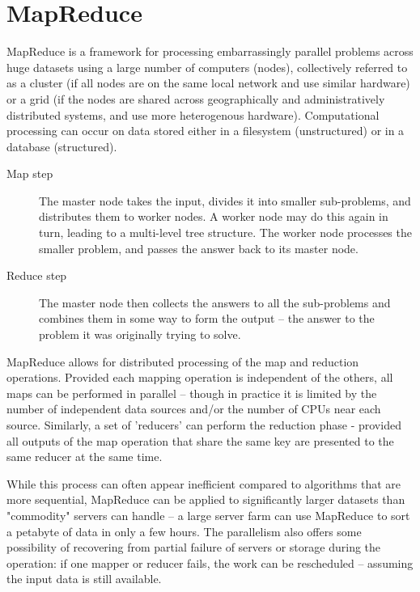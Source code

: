 
\section{MapReduce}
MapReduce is a framework for processing embarrassingly parallel problems across huge datasets using a large number of computers (nodes), collectively referred to as a cluster (if all nodes are on the same local network and use similar hardware) or a grid (if the nodes are shared across geographically and administratively distributed systems, and use more heterogenous hardware). Computational processing can occur on data stored either in a filesystem (unstructured) or in a database (structured).

\begin{description} \item[Map step] The master node takes the input, divides it into smaller sub-problems, and distributes them to worker nodes. A worker node may do this again in turn, leading to a multi-level tree structure. The worker node processes the smaller problem, and passes the answer back to its master node.
\item[Reduce step] The master node then collects the answers to all the sub-problems and combines them in some way to form the output – the answer to the problem it was originally trying to solve.
\end{description}

MapReduce allows for distributed processing of the map and reduction operations. Provided each mapping operation is independent of the others, all maps can be performed in parallel – though in practice it is limited by the number of independent data sources and/or the number of CPUs near each source. Similarly, a set of 'reducers' can perform the reduction phase - provided all outputs of the map operation that share the same key are presented to the same reducer at the same time. 

While this process can often appear inefficient compared to algorithms that are more sequential, MapReduce can be applied to significantly larger datasets than "commodity" servers can handle – a large server farm can use MapReduce to sort a petabyte of data in only a few hours. The parallelism also offers some possibility of recovering from partial failure of servers or storage during the operation: if one mapper or reducer fails, the work can be rescheduled – assuming the input data is still available.
